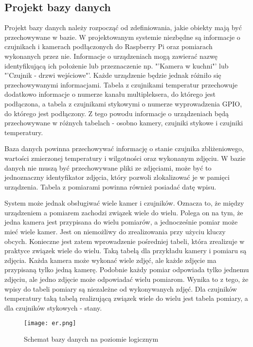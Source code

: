 \documentclass[a4paper,12pt,twoside]{article}
\begin{document}
\subsection{Projekt bazy danych}
Projekt bazy danych należy rozpocząć od zdefiniowania, jakie obiekty mają być przechowywane w bazie. W projektowanym systemie niezbędne są informacje o czujnikach i kamerach podłączonych do Raspberry Pi oraz pomiarach wykonanych przez nie. Informacje o urządzeniach mogą zawierać nazwę identyfikującą ich położenie lub przeznaczenie np. "'Kamera w kuchni"' lub "'Czujnik - drzwi wejściowe"'. Każde urządzenie będzie jednak różniło się przechowywanymi informacjami. Tabela z czujnikami temperatur przechowuje dodatkowo informacje o numerze kanału multipleksera, do którego jest podłączona, a tabela z czujnikami stykowymi o numerze wyprowadzenia GPIO, do którego jest podłączony. Z tego powodu informacje o urządzeniach będą przechowywane w różnych tabelach - osobno kamery, czujniki stykowe i czujniki temperatury.

Baza danych powinna przechowywać informację o stanie czujnika zbliżeniowego, wartości zmierzonej temperatury i wilgotności oraz wykonanym zdjęciu. W bazie danych nie muszą być przechowywane pliki ze zdjęciami, może być to jednoznaczny identyfikator zdjęcia, który pozwoli zlokalizować je w pamięci urządzenia. Tabela z pomiarami powinna również posiadać datę wpisu.

System może jednak obsługiwać wiele kamer i czujników. Oznacza to, że między urządzeniem a pomiarem zachodzi związek wiele do wielu. Polega on na tym, że jedna kamera jest przypisana do wielu pomiarów, a jednocześnie pomiar może mieć wiele kamer. Jest on niemożliwy do zrealizowania przy użyciu kluczy obcych. Konieczne jest zatem wprowadzenie pośredniej tabeli, która zrealizuje w praktyce związek wiele do wielu. Taką tabelą dla przykładu kamery i pomiaru są zdjęcia. Każda kamera może wykonać wiele zdjęć, ale każde zdjęcie ma przypisaną tylko jedną kamerę. Podobnie każdy pomiar odpowiada tylko jednemu zdjęciu, ale jedno zdjęcie może odpowiadać wielu pomiarom. Wynika to z tego, że wpisy do tabeli pomiary są niezależne od wykonywanych zdjęć. Dla czujników temperatury taką tabelą realizującą związek wiele do wielu jest tabela pomiary, a dla czujników stykowych - stany.

\begin{figure}[h]
\texttt{[image: er.png]}
\caption{Schemat bazy danych na poziomie logicznym}
\label{fig: er}
\end{figure}
\end{document}
